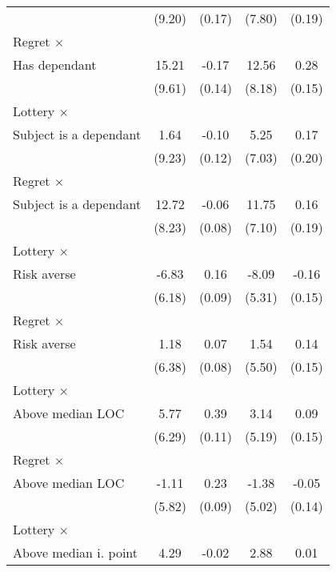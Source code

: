 \begin{table}[htbp]
\begin{tabular}{l*{4}{c}}
                &   (9.20)         &   (0.17)         &   (7.80)         &   (0.19)         \\
\addlinespace
Regret $\times$ \\ Has dependant&    15.21         &    -0.17         &    12.56         &     0.28\sym{*}  \\
                &   (9.61)         &   (0.14)         &   (8.18)         &   (0.15)         \\
\addlinespace
Lottery $\times$ \\ Subject is a dependant&     1.64         &    -0.10         &     5.25         &     0.17         \\
                &   (9.23)         &   (0.12)         &   (7.03)         &   (0.20)         \\
\addlinespace
Regret $\times$ \\ Subject is a dependant&    12.72         &    -0.06         &    11.75\sym{*}  &     0.16         \\
                &   (8.23)         &   (0.08)         &   (7.10)         &   (0.19)         \\
\addlinespace
Lottery $\times$ \\ Risk averse&    -6.83         &     0.16\sym{*}  &    -8.09         &    -0.16         \\
                &   (6.18)         &   (0.09)         &   (5.31)         &   (0.15)         \\
\addlinespace
Regret $\times$ \\ Risk averse&     1.18         &     0.07         &     1.54         &     0.14         \\
                &   (6.38)         &   (0.08)         &   (5.50)         &   (0.15)         \\
\addlinespace
Lottery $\times$ \\ Above median LOC&     5.77         &     0.39\sym{***}&     3.14         &     0.09         \\
                &   (6.29)         &   (0.11)         &   (5.19)         &   (0.15)         \\
\addlinespace
Regret $\times$ \\ Above median LOC&    -1.11         &     0.23\sym{**} &    -1.38         &    -0.05         \\
                &   (5.82)         &   (0.09)         &   (5.02)         &   (0.14)         \\
\addlinespace
Lottery $\times$ \\ Above median i. point&     4.29         &    -0.02         &     2.88         &     0.01         \\

\end{tabular}
\end{table}
